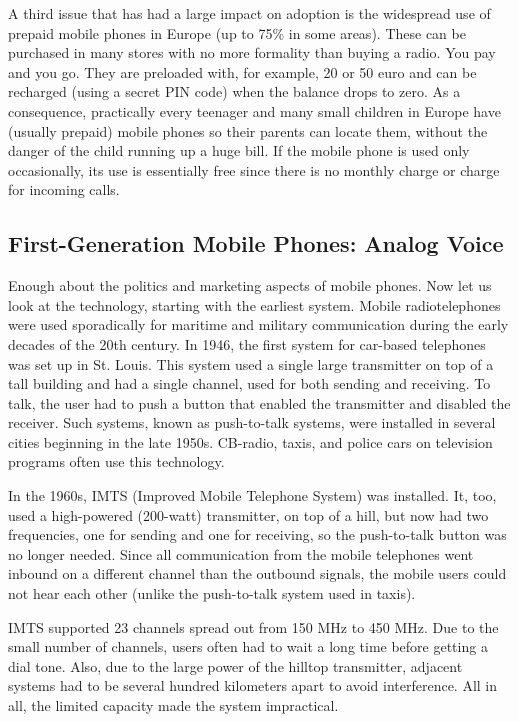 A third issue that has had a large impact on adoption is the widespread
use of prepaid mobile phones in Europe (up to 75\% in some areas). These
can be purchased in many stores with no more formality than buying a
radio. You pay and you go. They are preloaded with, for example, 20 or
50 euro and can be recharged (using a secret PIN code) when the balance
drops to zero. As a consequence, practically every teenager and many
small children in Europe have (usually prepaid) mobile phones so their
parents can locate them, without the danger of the child running up a
huge bill. If the mobile phone is used only occasionally, its use is
essentially free since there is no monthly charge or charge for incoming
calls.

\protect\hypertarget{0130661023_ch02lev1sec6.htmlux5cux23ch02lev2sec22}{}{}

\subsection{First-Generation Mobile Phones: Analog Voice}

Enough about the politics and marketing aspects of mobile phones. Now
let us look at the technology, starting with the earliest system. Mobile
radiotelephones were used sporadically for maritime and military
communication during the early decades of the 20th century. In 1946, the
first system for car-based telephones was set up in St. Louis. This
system used a single large transmitter on top of a tall building and had
a single channel, used for both sending and receiving. To talk, the user
had to push a button that enabled the transmitter and disabled the
receiver. Such systems, known as {push-to-talk systems}, were installed
in several cities beginning in the late 1950s. CB-radio, taxis, and
police cars on television programs often use this technology.

In the 1960s, {IMTS} ({Improved Mobile Telephone System}) was installed.
It, too, used a high-powered (200-watt) transmitter, on top of a hill,
but now had two frequencies, one for sending and one for receiving, so
the push-to-talk button was no longer needed. Since all communication
from the mobile telephones went inbound on a different channel than the
outbound signals, the mobile users could not hear each other (unlike the
push-to-talk system used in taxis).

IMTS supported 23 channels spread out from 150 MHz to 450 MHz. Due to
the small number of channels, users often had to wait a long time before
getting a dial tone. Also, due to the large power of the hilltop
transmitter, adjacent systems had to be several hundred kilometers apart
to avoid interference. All in all, the limited capacity made the system
impractical.

